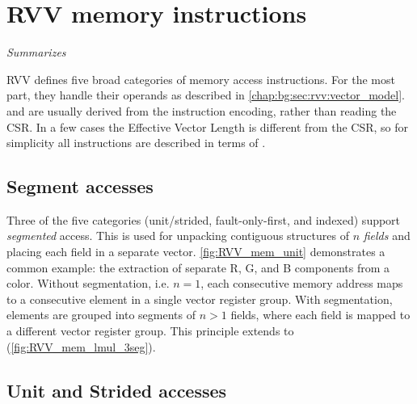 \section{RVV memory instructions}
\emph{Summarizes \cite[Sections 7-9]{RISCVVectorExtension2021}}


RVV defines five broad categories of memory access instructions.
For the most part, they handle their operands as described in \cref{chap:bg:sec:rvv:vector_model}.
 and  are usually derived from the instruction encoding, rather than reading the  CSR.
In a few cases the Effective Vector Length  is different from the  CSR, so for simplicity all instructions are described in terms of .

\subsection{Segment accesses}
Three of the five categories (unit/strided, fault-only-first, and indexed) support \emph{segmented} access.
This is used for unpacking contiguous structures of $n$ \emph{fields} and placing each field in a separate vector.
\cref{fig:RVV_mem_unit} demonstrates a common example: the extraction of separate R, G, and B components from a color.
Without segmentation, i.e. $n = 1$, each consecutive memory address maps to a consecutive element in a single vector register group.
With segmentation, elements are grouped into segments of $n > 1$ fields, where each field is mapped to a different vector register group.
This principle extends to  (\cref{fig:RVV_mem_lmul_3seg}).




\pagebreak
\subsection{Unit and Strided accesses}\label{chap:bg:sec:rvv:unitstrideaccess}


